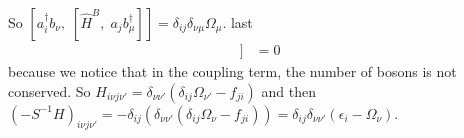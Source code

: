 So $[a_i^\dagger b_\nu,\;[\hat H^B,\;a_j b_{\mu}^\dagger]] = \delta_{ij} \delta_{\nu \mu} \Omega_{\mu}$.
last
\begin{align}
[a_i^\dagger b_\nu,\;[\hat V^{eB},\;a_j b_{\nu'}^\dagger]] & = 0
\end{align}
because we notice that in the coupling term, the number of bosons is not conserved.
So ${H_{i\nu j \nu'} = \delta_{\nu \nu'} \left(\delta_{ij}\Omega_{\nu'}- f_{ji}\right)}$ and then $\boxed{(-{S^{-1}H})_{i\nu j \nu'} = -\delta_{ij}\left( \delta_{\nu \nu'} \left(\delta_{ij}\Omega_{\nu}- f_{ji}\right)\right)= \delta_{ij}\delta_{\nu \nu'}\left(\epsilon_i - \Omega_{\nu}\right)}$.
